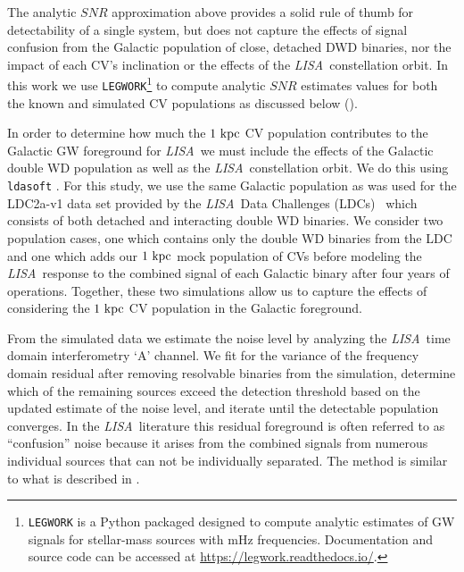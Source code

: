 \documentclass[fleqn,usenatbib]{mnras}
\newcommand{\lisa}{{\it LISA}}
\newcommand{\kb}[1]{[\textcolor{teal}{KB: #1}]}
\begin{document}
The analytic $SNR$ approximation above provides a solid rule of thumb for detectability of a single system, but does not capture the effects of signal confusion from the Galactic population of close, detached DWD binaries, nor the impact of each CV's inclination or the effects of the \lisa\ constellation orbit. In this work we use \texttt{LEGWORK}\footnote{\texttt{LEGWORK} is a Python packaged designed to compute analytic estimates of GW signals for stellar-mass sources with mHz frequencies. Documentation and source code can be accessed at \href{https://legwork.readthedocs.io/}{https://legwork.readthedocs.io/}.} to compute analytic $SNR$ estimates values for both the known and simulated CV populations as discussed below (\citealt{LEGWORK_joss,LEGWORK_apjs}). 


In order to determine how much the $1~\rm{kpc}$ CV population contributes to the Galactic GW foreground for \lisa\, we must include the effects of the Galactic double WD population as well as the \lisa\ constellation orbit. We do this using \texttt{ldasoft} \citep{ldasoft}. For this study, we use the same Galactic population as was used for the LDC2a-v1 data set provided by the \lisa\ Data Challenges (LDCs)~\citep{le_jeune_maude_2022_7132178} which consists of both detached and interacting double WD binaries. We consider two population cases, one which contains only the double WD binaries from the LDC and one which adds our $1~\rm{kpc}$ mock population of CVs before modeling the \lisa\ response to the combined signal of each Galactic binary after four years of operations. Together, these two simulations allow us to capture the effects of considering the $1~\rm{kpc}$ CV population in the Galactic foreground. 

From the simulated data we estimate the noise level by analyzing the \lisa\ time domain interferometry `A' channel. We fit for the variance of the frequency domain residual after removing resolvable binaries from the simulation, determine which of the remaining sources exceed the detection threshold based on the updated estimate of the noise level, and iterate until the detectable population converges. In the \lisa\ literature this residual foreground is often referred to as ``confusion'' noise because it arises from the combined signals from numerous individual sources that can not be individually separated. The method is similar to what is described in \cite{2021PhRvD.104d3019K}. 
\end{document}
